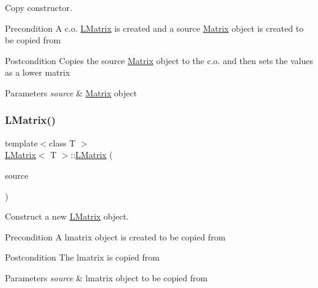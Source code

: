 Copy constructor. 

\begin{DoxyPrecond}{Precondition}
A c.\+o. \mbox{\hyperlink{class_l_matrix}{L\+Matrix}} is created and a source \mbox{\hyperlink{class_matrix}{Matrix}} object is created to be copied from 
\end{DoxyPrecond}
\begin{DoxyPostcond}{Postcondition}
Copies the source \mbox{\hyperlink{class_matrix}{Matrix}} object to the c.\+o. and then sets the values as a lower matrix 
\end{DoxyPostcond}

\begin{DoxyParams}{Parameters}
{\em source} & \mbox{\hyperlink{class_matrix}{Matrix}} object \\
\hline
\end{DoxyParams}
\mbox{\label{class_l_matrix_a0a4d56623c6c83d9fd2c3040e41429ae}} 
\subsubsection{\texorpdfstring{LMatrix()}{LMatrix()}\hspace{0.1cm}{\footnotesize\ttfamily [4/5]}}
{\footnotesize\ttfamily template$<$class T $>$ \\
\mbox{\hyperlink{class_l_matrix}{L\+Matrix}}$<$ T $>$\+::\mbox{\hyperlink{class_l_matrix}{L\+Matrix}} (\begin{DoxyParamCaption}\item[{const \mbox{\hyperlink{class_l_matrix}{L\+Matrix}}$<$ T $>$ \&}]{source }\end{DoxyParamCaption})}



Construct a new \mbox{\hyperlink{class_l_matrix}{L\+Matrix}} object. 

\begin{DoxyPrecond}{Precondition}
A lmatrix object is created to be copied from 
\end{DoxyPrecond}
\begin{DoxyPostcond}{Postcondition}
The lmatrix is copied from
\end{DoxyPostcond}

\begin{DoxyParams}{Parameters}
{\em source} & lmatrix object to be copied from \\
\hline
\end{DoxyParams}
\mbox{\label{class_l_matrix_ab4289f015b6b154b0f396550c1975250}} 
